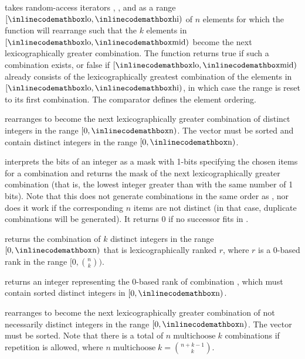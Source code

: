 \begin{compactitem}
  \item {} takes random-access iterators , , and  as a range $[{\inlinecodemath{lo}}, {\inlinecodemath{hi}})$ of $n$ elements for which the function will rearrange such that the $k$ elements in $[{\inlinecodemath{lo}}, {\inlinecodemath{mid}})$ become the next lexicographically greater combination. The function returns true if such a combination exists, or false if $[{\inlinecodemath{lo}}, {\inlinecodemath{mid}})$ already consists of the lexicographically greatest combination of the elements in $[{\inlinecodemath{lo}}, {\inlinecodemath{hi}})$, in which case the range is reset to its first combination. The comparator  defines the element ordering.
  \item {} rearranges  to become the next lexicographically greater combination of distinct integers in the range $[0, {\inlinecodemath{n}})$. The vector  must be sorted and contain distinct integers in the range $[0, {\inlinecodemath{n}})$.
  \item {} interprets the bits of an integer  as a mask with 1-bits specifying the chosen items for a combination and returns the mask of the next lexicographically greater combination (that is, the lowest integer greater than  with the same number of 1 bits). Note that this does not generate combinations in the same order as , nor does it work if the corresponding $n$ items are not distinct (in that case, duplicate combinations will be generated). It returns $0$ if no successor fits in .
  \item {} returns the combination of $k$ distinct integers in the range $[0, {\inlinecodemath{n}})$ that is lexicographically ranked $r$, where $r$ is a 0-based rank in the range $[0, \binom{n}{k})$.
  \item {} returns an integer representing the 0-based rank of combination , which must contain sorted distinct integers in $[0, {\inlinecodemath{n}})$.
  \item {} rearranges  to become the next lexicographically greater combination of not necessarily distinct integers in the range $[0, {\inlinecodemath{n}})$. The vector  must be sorted. Note that there is a total of $n \mathbin{\text{multichoose}} k$ combinations if repetition is allowed, where $n \mathbin{\text{multichoose}} k = \binom{n + k - 1}{k}$.
\end{compactitem}

